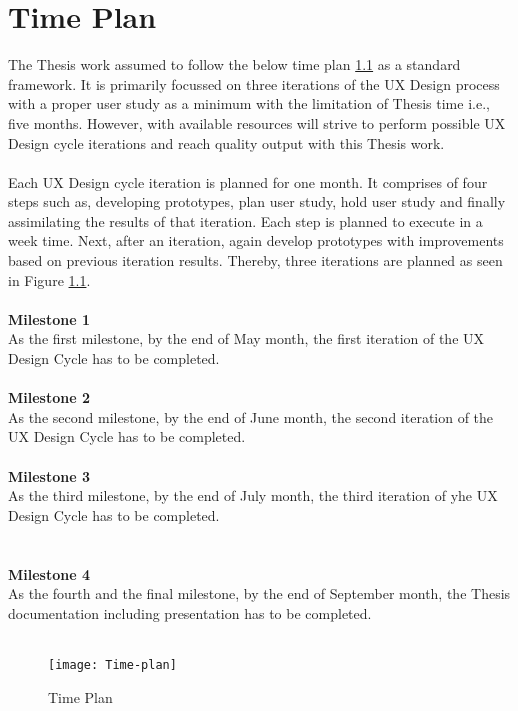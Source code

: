 \chapter{Time Plan}
\label{ch:timeplan}

The Thesis work assumed to follow the below time plan \ref{fig:time-plan} as a standard framework. It is primarily focussed on three iterations of the UX Design process with a proper user study as a minimum with the limitation of Thesis time i.e., five months. However, with available resources will strive to perform possible UX Design cycle iterations and reach quality output with this Thesis work. \\ \\ 

Each UX Design cycle iteration is planned for one month. It comprises of four steps such as, developing prototypes, plan user study, hold user study and finally assimilating the results of that iteration. Each step is planned to execute in a week time. Next, after an iteration, again develop prototypes with improvements based on previous iteration results. Thereby, three iterations are planned as seen in Figure \ref{fig:time-plan}. \\ \\

\textbf{Milestone 1} \\

As the first milestone, by the end of May month, the first iteration of the UX Design Cycle has to be completed. \\ \\ 

\textbf{Milestone 2} \\

As the second milestone, by the end of June month, the second iteration of the UX Design Cycle has to be completed. \\ \\

\textbf{Milestone 3} \\

As the third milestone, by the end of July month, the third iteration of yhe UX Design Cycle has to be completed. \\ \\ \\

\textbf{Milestone 4} \\

As the fourth and the final milestone, by the end of September month, the Thesis documentation including presentation has to be completed. \\ \\

 
\begin{figure}[h]
	\texttt{[image: Time-plan]}
	\centering
	\caption{Time Plan}
	\label{fig:time-plan}
\end{figure}

